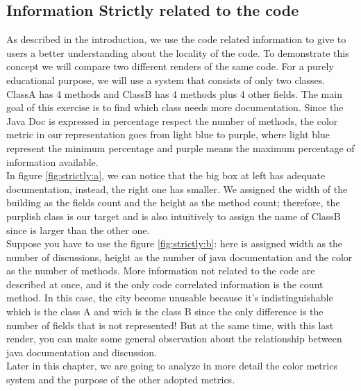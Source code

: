 \documentclass[]{usiinfbachelorproject}
\begin{document}
\subsection{Information Strictly related to the code}
As described in the introduction, we use the code related information to give to users a better understanding about the locality of the code. To demonstrate this concept we will compare two different renders of the same code. For a purely educational purpose, we will use a system that consists of only two classes. ClassA has 4 methods and ClassB has 4 methods plus 4 other fields. The main goal of this exercise is to find which class needs more documentation. Since the Java Doc is expressed in percentage respect the number of methods, the color metric in our representation goes from light blue to purple, where light blue represent the minimum percentage and purple means the maximum percentage of information available.\\ In figure \ref{fig:strictly:a}, we can notice that the big box at left has adequate documentation, instead, the right one has smaller. We assigned the width of the building as the fields count and the height as the method count; therefore, the purplish class is our target and is also intuitively to assign the name of ClassB since is larger than the other one.\\
Suppose you have to use the figure \ref{fig:strictly:b}: here is assigned width as the number of discussions, height as the number of java documentation and the color as the number of methods. More information not related to the code are described at once, and it the only code correlated information is the count method. In this case, the city become unusable because it's indistinguishable which is the class A and wich is the class B since the only difference is the number of fields that is not represented! But at the same time, with this last render, you can make some general observation about the relationship between java documentation and discussion.\\
Later in this chapter, we are going to analyze in more detail the color metrics system and the purpose of the other adopted metrics.

 
 
 
 
\end{document}
